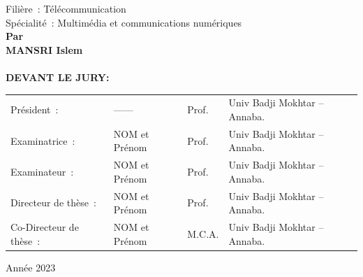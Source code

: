 \documentclass[x11names, a4paper, oneside, 11pt]{book}
\begin{document}
\begin{titlepage}
\begin{center}
\large
Filière~: Télécommunication\\[.6\baselineskip]
Spécialité~: Multimédia et communications numériques\\[1\baselineskip]
\textbf{Par}\\[.3\baselineskip]
\Large{\textbf{MANSRI Islem}}\\[.9\baselineskip]

%
\\[1\baselineskip]

\vfill\vfill
\large
\textbf{{\textup{DEVANT LE JURY:}}}\\
\end{center}
\vfill

\normalsize
\hspace{0cm}
\begin{tabular}{lllll}
Pr\'esident~:           &   ------                     & Prof.  & Univ Badji Mokhtar – Annaba.\\
Examinatrice~:          &   NOM et Prénom              & Prof.  & Univ Badji Mokhtar – Annaba.\\
Examinateur~:           &   NOM et Prénom              & Prof.  & Univ Badji Mokhtar – Annaba.\\
Directeur de thèse~:    &   NOM et Prénom              & Prof.  & Univ Badji Mokhtar – Annaba.\\
Co-Directeur de thèse~: &   NOM et Prénom              & M.C.A. & Univ Badji Mokhtar – Annaba.\\
\end{tabular}

\vfill
\begin{center}
Année 2023
\end{center}
\end{titlepage}
\titlepage
\clearpage
\end{document}
